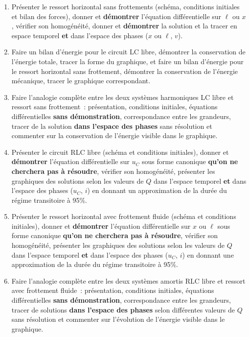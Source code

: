 \documentclass[a4paper, 12pt, final, garamond]{book}
\begin{document}
\begin{enumerate}
    \item Présenter le ressort horizontal sans frottements (schéma, conditions
        initiales et bilan des forces), donner et \textbf{démontrer} l'équation
        différentielle sur $\ell$ ou $x$, vérifier son homogénéité, donner et
        \textbf{démontrer} la solution et la tracer en espace temporel
        \textbf{et} dans l'espace des phases ($x$ ou $\ell$, $v$).

    \item Faire un bilan d'énergie pour le circuit LC libre, démontrer la
        conservation de l'énergie totale, tracer la forme du graphique, et faire
        un bilan d'énergie pour le ressort horizontal sans frottement, démontrer
        la conservation de l'énergie mécanique, tracer le graphique
        correspondant.

    \item Faire l'analogie complète entre les deux systèmes harmoniques LC libre
        et ressort sans frottement~: présentation, conditions initiales,
        équations différentielles \textbf{sans démonstration}, correspondance
        entre les grandeurs, tracer de la solution \textbf{dans l'espace des
        phases} sans résolution et commenter sur la conservation de l'énergie
        visible dans le graphique.

    \item Présenter le circuit RLC libre (schéma et conditions initiales),
        donner et \textbf{démontrer} l'équation différentielle sur $u_C$ sous
        forme canonique \textbf{qu'on ne cherchera pas à résoudre}, vérifier son
        homogénéité, présenter les graphiques des solutions selon les valeurs de
        $Q$ dans l'espace temporel \textbf{et} dans l'espace des phases ($u_C$,
        $i$) en donnant un approximation de la durée du régime transitoire à
        95\%.
    \item Présenter le ressort horizontal avec frottement fluide (schéma et
        conditions initiales), donner et \textbf{démontrer} l'équation
        différentielle sur $x$ ou $\ell$ sous forme canonique \textbf{qu'on ne
        cherchera pas à résoudre}, vérifier son homogénéité, présenter les
        graphiques des solutions selon les valeurs de $Q$ dans l'espace temporel
        \textbf{et} dans l'espace des phases ($u_C$, $i$) en donnant une
        approximation de la durée du régime transitoire à 95\%.

    \item Faire l'analogie complète entre les deux systèmes amortis RLC libre et
        ressort avec frottement fluide~: présentation, conditions initiales,
        équations différentielles \textbf{sans démonstration}, correspondance
        entre les grandeurs, tracer de solutions \textbf{dans l'espace des
        phases} selon différentes valeurs de $Q$ sans résolution et commenter
        sur l'évolution de l'énergie visible dans le graphique.


\end{enumerate}
\end{document}
